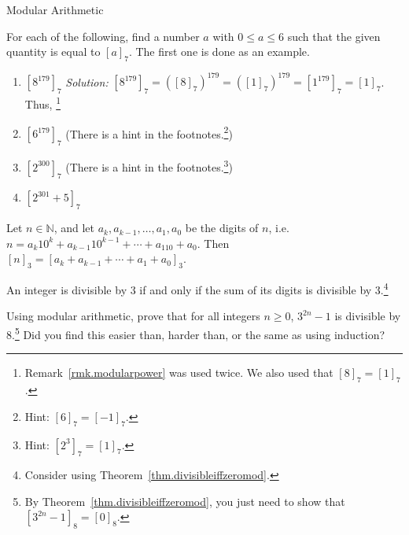 \begin{section}{Modular Arithmetic}
\begin{exercise}
For each of the following, find a number $a$ with $0\le a \le 6$ such that the given quantity is equal to $[a]_7$. The first one is done as an example.
\begin{enumerate}[label=\textrm{(\alph*)}]
\item $[8^{179}]_7$
 \quad\textit{Solution:}  $[8^{179}]_7 = ([8]_7)^{179} =  ([1]_7)^{179} =  [1^{179}]_7 = [1]_7$. Thus,  \footnote{Remark~\ref{rmk.modularpower} was used twice. We also used that  $[8]_7 = [1]_7$.}
\item $[6^{179}]_7$ \quad(There is a hint in the footnotes.\footnote{Hint:  $[6]_7 = [-1]_7$.})
\item $[2^{300}]_7$ \quad(There is a hint in the footnotes.\footnote{Hint:  $[2^3]_7 = [1]_7$.})
\item $[2^{301} +5]_7$
\end{enumerate}
\end{exercise}

\begin{theorem}
Let $n\in \mathbb{N}$, and let $a_k, a_{k-1}, \ldots, a_1, a_0$ be the digits of $n$, i.e. $n=a_k10^k + a_{k-1}10^{k-1} + \cdots + a_110 + a_0$. Then $[n]_3 =  [a_k + a_{k-1} + \cdots + a_1 + a_0]_3$.
\end{theorem}

\begin{theorem}
An integer is divisible by $3$ if and only if the sum of its digits is divisible by $3$.\footnote{Consider using Theorem~\ref{thm.divisibleiffzeromod}.}
\end{theorem}

\begin{exercise}
Using modular arithmetic, prove that for all integers $n \ge 0$, $3^{2n}-1$ is divisible by $8$.\footnote{By Theorem~\ref{thm.divisibleiffzeromod}, you just need to show that $[3^{2n}-1]_8 = [0]_8$.} Did you find this easier than, harder than, or the same as using induction?
\end{exercise}

\end{section}
